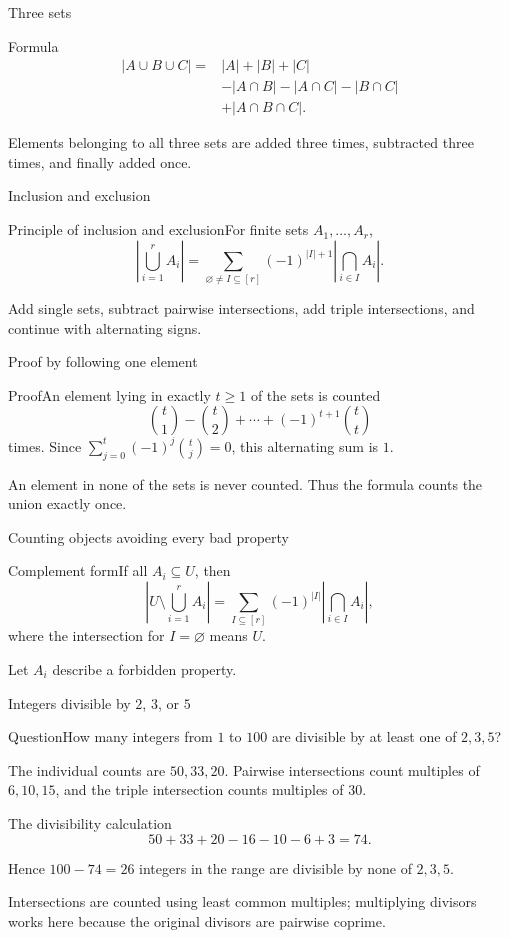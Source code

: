 \documentclass[aspectratio=169,11pt]{beamer}
\newcommand{\Thm}[2]{\begin{block}{#1}#2\end{block}}
\renewcommand{\Proof}[1]{\begin{block}{Proof}\normalsize #1\end{block}}
\newcommand{\Question}[1]{\begin{block}{Question}#1\end{block}}
\newcommand{\gap}{\par\medskip}
\begin{document}
\begin{frame}{Three sets}
\large
\Thm{Formula}{\begin{align*}
|A\cup B\cup C|={}&|A|+|B|+|C|\\
&-|A\cap B|-|A\cap C|-|B\cap C|\\
&+|A\cap B\cap C|.
\end{align*}}
\gap Elements belonging to all three sets are added three times, subtracted three times, and finally added once.
\end{frame}
\begin{frame}{Inclusion and exclusion}
\large
\Thm{Principle of inclusion and exclusion}{For finite sets $A_1,\ldots,A_r$,
\[\left|\bigcup_{i=1}^r A_i\right|
=\sum_{\varnothing\ne I\subseteq[r]}(-1)^{|I|+1}
\left|\bigcap_{i\in I}A_i\right|.\]}
\gap Add single sets, subtract pairwise intersections, add triple intersections, and continue with alternating signs.
\end{frame}
\begin{frame}{Proof by following one element}
\large
\Proof{An element lying in exactly $t\geq1$ of the sets is counted
\[\binom t1-\binom t2+\cdots+(-1)^{t+1}\binom tt\]
times. Since $\sum_{j=0}^t(-1)^j\binom tj=0$, this alternating sum is $1$.\gap An element in none of the sets is never counted. Thus the formula counts the union exactly once.}
\end{frame}
\begin{frame}{Counting objects avoiding every bad property}
\large
\Thm{Complement form}{If all $A_i\subseteq U$, then
\[\left|U\setminus\bigcup_{i=1}^r A_i\right|
=\sum_{I\subseteq[r]}(-1)^{|I|}\left|\bigcap_{i\in I}A_i\right|,\]
where the intersection for $I=\varnothing$ means $U$.}
\gap Let $A_i$ describe a forbidden property.
\end{frame}
\begin{frame}{Integers divisible by $2$, $3$, or $5$}
\large
\Question{How many integers from $1$ to $100$ are divisible by at least one of $2,3,5$?}
\gap The individual counts are $50,33,20$. Pairwise intersections count multiples of $6,10,15$, and the triple intersection counts multiples of $30$.
\end{frame}
\begin{frame}{The divisibility calculation}
\large
\[50+33+20-16-10-6+3=74.\]
\gap Hence $100-74=26$ integers in the range are divisible by none of $2,3,5$.
\gap Intersections are counted using least common multiples; multiplying divisors works here because the original divisors are pairwise coprime.
\end{frame}
\end{document}
